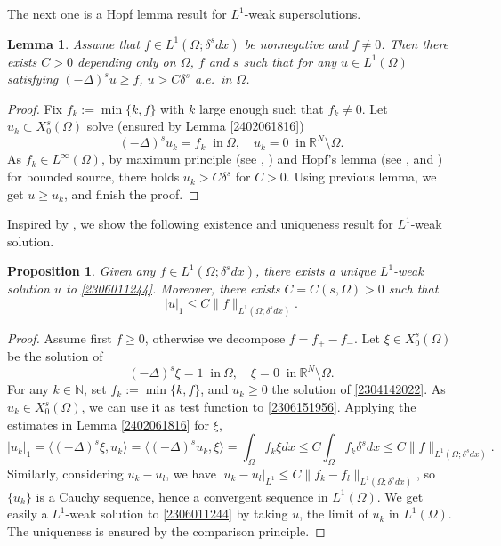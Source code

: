 \documentclass[10pt]{article}
\numberwithin{equation}{section}
\newtheorem{proposition}[theorem]{Proposition}
\newtheorem{lemma}[theorem]{Lemma}
\def \N{{\mathbb N}}
\def \O{\Omega}
\numberwithin{equation}{section}
\begin{document}
The next one is a Hopf lemma result for $L^1$-weak supersolutions.
\begin{lemma}\label{2306012122}
Assume that $f\in L^1(\Omega; \delta^s dx)$ be nonnegative and $f\ne 0$. Then there exists $C> 0$ depending only on $\Omega$, $f$ and $s$ such that for any $u\in L^1(\Omega)$ satisfying $(-\Delta)^s u\ge f$, $u>C\delta^s$ a.e.~in $\Omega$.
\end{lemma}
\begin{proof}
Fix $f_k:=\min\{k, f\}$ with $k$ large enough such that $f_k\ne 0$. Let $u_k \subset X_0^s(\Omega)$ solve (ensured by Lemma \ref{2402061816})
\begin{equation}
\label{2304142022}
(-\Delta)^s u_k = f_k \;\;\text{in}~\Omega,\quad u_k =0 \;\;\text{in}~\mathbb{R}^N\setminus\Omega.
\end{equation}
As $f_k \in L^\infty(\Omega)$, by maximum principle (see \cite[Proposition 2.2.8]{S2007}, \cite[Theorem A.1]{BF2014}) and Hopf's lemma (see \cite[Proposition 2.7]{CRS2010}, \cite[Lemma 3.2]{RS2014} and \cite[Theorem 1.5]{DQ2017}) for bounded source, there holds $u_k>C\delta^s$ for $C>0$. Using previous lemma, we get $u\ge u_k$, and finish the proof.
\end{proof}

Inspired by \cite{BCM1996}, we show the following existence and uniqueness result for $L^1$-weak solution.
\begin{proposition}\label{2304232341}
Given any $f\in L^1(\Omega; \delta^s dx) $, there exists a unique $L^1$-weak solution $u$ to \eqref{2306011244}. Moreover, there exists $C=C(s, \Omega)>0$ such that
\begin{equation}\label{2304142025}
|u|_1\le C\|f\|_{L^1(\Omega; \delta^s dx) }.
\end{equation}
\end{proposition}
\begin{proof}
Assume first $f\ge 0$, otherwise we decompose $f = f_+ - f_-$. Let $\xi\in X_0^s(\Omega)$ be the solution of
\begin{equation}\label{2306151956}
(-\Delta)^s \xi = 1 \;\;\text{in}~\Omega,\quad
\xi =0 \;\;\text{in}~\mathbb{R}^N\setminus\Omega.
\end{equation}
For any $k\in \N$, set $f_k:=\min\{k, f\}$, and $u_k\geq 0$ the solution of \eqref{2304142022}.
As $u_k \in X_0^s(\Omega)$, we can use it as test function to \eqref{2306151956}. Applying the estimates in Lemma \ref{2402061816} for $\xi$,
\[
|u_k|_1 = \langle (-\Delta)^s \xi, u_k\rangle = \langle (-\Delta)^s u_k, \xi\rangle = \int_\O f_k\xi dx \leq C\int_\O f_k\delta^sdx \leq C\|f\|_{L^1(\Omega; \delta^s dx)}.
\]
Similarly, considering $u_k - u_l$, we have
$|u_k-u_l|_{L^1} \leq C\|f_k-f_l\|_{L^1(\Omega; \delta^s dx)}$, so $\{u_k\}$ is a Cauchy sequence, hence a convergent sequence in $L^1(\O)$. We get easily a $L^1$-weak solution to \eqref{2306011244} by taking $u$, the limit of $u_k$ in $L^1(\Omega)$. The uniqueness is ensured by the comparison principle.
\end{proof}
\end{document}
